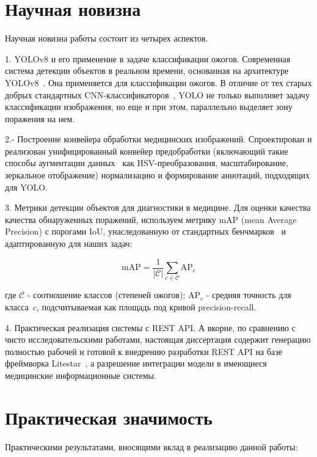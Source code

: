 \section{Научная новизна}

Научная новизна работы состоит из четырех аспектов.

1. YOLOv8 и его применение в задаче классификации ожогов. Современная система детекции объектов в реальном времени, основанная на архитектуре YOLOv8~\cite{ultralytics2023yolov8}. Она применяется для классификации ожогов. В отличие от тех старых добрых стандартных CNN-классификаторов~\cite{he2016resnet,simonyan2014vgg}, YOLO не только выполняет задачу классификации изображения, но еще и при этом, параллельно выделяет зону поражения на нем.

2.- Построение конвейера обработки медицинских изображений. Спроектирован и реализован унифицированный конвейер предобработки (включающий такие способы аугментации данных~\cite{shorten2019augmentation} как HSV-преобразования, масштабирование, зеркальное отображение) нормализацию и формирование аннотаций, подходящих для YOLO.

3. Метрики детекции объектов для диагностики в медицине. Для оценки качества качества обнаруженных поражений, используем метрику mAP (mean Average Precision) с порогами IoU, унаследованную от стандартных бенчмарков~\cite{lin2014coco,everingham2010pascal} и адаптированную для наших задач:

\begin{equation}
\text{mAP} = \frac{1}{|\mathcal{C}|} \sum_{c \in \mathcal{C}} \text{AP}_c
\label{eq:map}
\end{equation}

\noindent где $\mathcal{C}$ - соотношение классов (степеней ожогов); $\text{AP}_c$ - средняя точность для класса~$c$, подсчитываемая как площадь под кривой precision-recall.

4. Практическая реализация системы с REST API. А вкорне, по сравнению с чисто исследовательскими работами, настоящая диссертация содержит генерацию полностью рабочей и готовой к внедрению разработки REST API на базе фреймворка Litestar~\cite{litestar2023}, а разрешение интеграции модели в имеющиеся медицинские информационные системы. \section{Практическая значимость}

Практическими результатами, вносящими вклад в реализацию данной работы:

